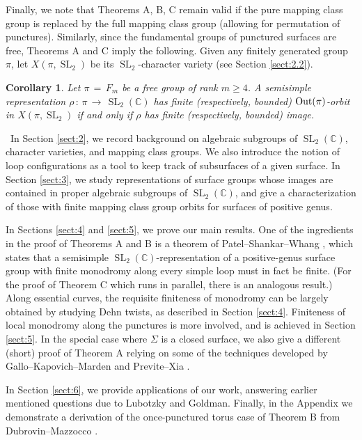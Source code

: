 \documentclass[reqno]{amsart}
\theoremstyle{plain}
\newtheorem*{ncorollary}{Corollary}
\theoremstyle{definition}
\theoremstyle{remark}
\newcommand{\C}{{\mathbb{C}}}
\DeclareMathOperator{\Out}{\textup{Out}}
\DeclareMathOperator{\SL}{SL}
\begin{document}
Finally, we note that Theorems A, B, C remain valid if the pure mapping class group is replaced by the full mapping class group (allowing for permutation of punctures). Similarly, since the fundamental groups of punctured surfaces are free, Theorems A and C imply the following. Given any finitely generated group $\pi$, let $X(\pi,\SL_2)$ be its $\SL_2$-character variety (see Section \ref{sect:2.2}).

\begin{ncorollary}
Let $\pi\,=\,F_m$ be a free group of rank $m\geq4$. A semisimple representation $\rho\,:\,\pi\,\to\,\SL_2(\C)$ has
finite (respectively, bounded) $\Out(\pi)$-orbit in $X(\pi,\SL_2)$ if and only if $\rho$ has finite (respectively, bounded) image.
\end{ncorollary}

\,
In Section \ref{sect:2}, we record background on algebraic subgroups of $\SL_2(\C)$, character 
varieties, and mapping class groups. We also introduce the notion of loop configurations as a 
tool to keep track of subsurfaces of a given surface. In Section \ref{sect:3}, we study 
representations of surface groups whose images are contained in proper algebraic subgroups of 
$\SL_2(\C)$, and give a characterization of those with finite mapping class group orbits for 
surfaces of positive genus.

In Sections \ref{sect:4} and \ref{sect:5}, we prove our main results. One of the ingredients in the proof of Theorems A and B is a theorem of Patel--Shankar--Whang \cite[Theorem 1.2]{psw}, which states that a semisimple $\SL_2(\C)$-representation of a positive-genus surface group with finite monodromy along every simple loop must in fact be finite. (For the proof of Theorem C which runs in parallel, there is an analogous result.) Along essential curves, the requisite finiteness of monodromy can be largely obtained by studying Dehn twists, as described in Section \ref{sect:4}. Finiteness of local monodromy along the punctures is more involved, and is achieved in Section \ref{sect:5}. In the special case where $\Sigma$ is a closed surface, we also give a different (short) proof of Theorem A 
relying on some of the techniques developed by Gallo--Kapovich--Marden \cite{gkm} and Previte--Xia \cite{px}. 

In 
Section \ref{sect:6}, we provide applications of our work, answering earlier
mentioned questions due to Lubotzky and Goldman. Finally, in the Appendix we demonstrate a derivation of the once-punctured torus case of Theorem B from Dubrovin--Mazzocco \cite{dm}.
\end{document}
